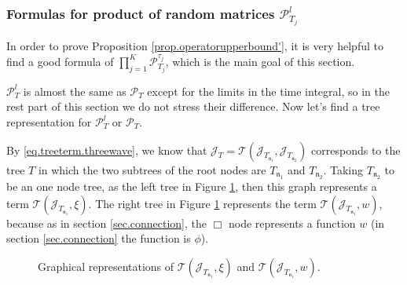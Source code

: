 \subsubsection{Formulas for product of random matrices $\mathcal{P}^l_{T_j}$} In order to prove Proposition \ref{prop.operatorupperbound'}, it is very helpful to find a good formula of  $\prod_{j=1}^K\mathcal{P}^{\tau_j}_{T_j}$, which is the main goal of this section.

$\mathcal{P}^{l}_{T}$ is almost the same as $\mathcal{P}_{T}$ except for the limits in the time integral, so in the rest part of this section we do not stress their difference. Now let's find a tree representation for $\mathcal{P}^{l}_{T}$ or $\mathcal{P}_{T}$.


By \eqref{eq.treeterm.threewave}, we know that $\mathcal{J}_{T}=\mathcal{T}(\mathcal{J}_{T_{\mathfrak{n}_1}}, \mathcal{J}_{T_{\mathfrak{n}_2}})$ corresponds to the tree $T$ in which the two subtrees of the root nodes are $T_{\mathfrak{n}_1}$ and $T_{\mathfrak{n}_2}$. Taking $T_{\mathfrak{n}_2}$ to be an one node tree, as the left tree in Figure \ref{fig.T(J,xi)andT(J,w)}, then this graph represents a term $\mathcal{T}(\mathcal{J}_{T_{\mathfrak{n}_1}}, \xi)$. The right tree in Figure \ref{fig.T(J,xi)andT(J,w)} represents the term $\mathcal{T}(\mathcal{J}_{T_{\mathfrak{n}_1}}, w)$, because as in section \ref{sec.connection}, the $\Box$ node represents a function $w$ (in section \ref{sec.connection} the function is $\phi$).

 \begin{figure}[H]
    \centering
        \caption{Graphical representations of $\mathcal{T}(\mathcal{J}_{T_{\mathfrak{n}_1}}, \xi)$ and $\mathcal{T}(\mathcal{J}_{T_{\mathfrak{n}_1}}, w)$.}
        \label{fig.T(J,xi)andT(J,w)}
    \end{figure}

